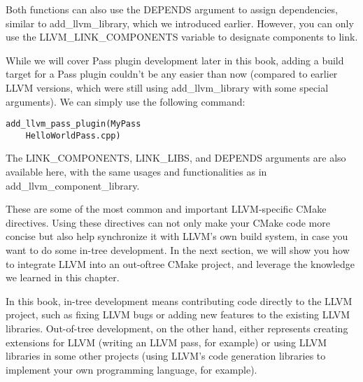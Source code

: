 Both functions can also use the DEPENDS argument to assign dependencies, similar to add\_llvm\_library, which we introduced earlier. However, you can only use the LLVM\_LINK\_COMPONENTS variable to designate components to link.


While we will cover Pass plugin development later in this book, adding a build target for a Pass plugin couldn't be any easier than now (compared to earlier LLVM versions, which were still using add\_llvm\_library with some special arguments). We can simply use the following command:

\begin{lstlisting}[style=styleCMake]
add_llvm_pass_plugin(MyPass
	HelloWorldPass.cpp)
\end{lstlisting}

The LINK\_COMPONENTS, LINK\_LIBS, and DEPENDS arguments are also available here, with the same usages and functionalities as in add\_llvm\_component\_library.

These are some of the most common and important LLVM-specific CMake directives. Using these directives can not only make your CMake code more concise but also help synchronize it with LLVM's own build system, in case you want to do some in-tree development. In the next section, we will show you how to integrate LLVM into an out-oftree CMake project, and leverage the knowledge we learned in this chapter.

\begin{tcolorbox}[colback=blue!5!white,colframe=blue!75!black, title=In-tree versus out-of-tree development]
\hspace*{0.7cm}In this book, in-tree development means contributing code directly to the LLVM project, such as fixing LLVM bugs or adding new features to the existing LLVM libraries. Out-of-tree development, on the other hand, either represents creating extensions for LLVM (writing an LLVM pass, for example) or using LLVM libraries in some other projects (using LLVM's code generation libraries to implement your own programming language, for example).
\end{tcolorbox}














